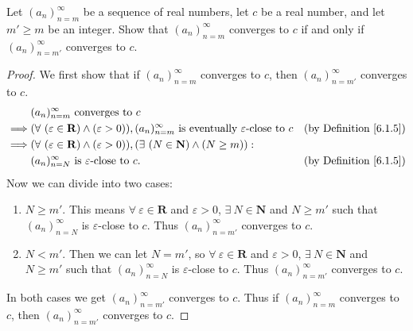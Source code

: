 \begin{exercise}\label{ex 6.1.3}
Let \((a_n)_{n = m}^\infty\) be a sequence of real numbers, let \(c\) be a real number, and let \(m' \geq m\) be an integer.
Show that \((a_n)_{n = m}^\infty\) converges to \(c\) if and only if \((a_n)_{n = m'}^\infty\) converges to \(c\).
\end{exercise}

\begin{proof}
We first show that if \((a_n)_{n = m}^\infty\) converges to \(c\), then \((a_n)_{n = m'}^\infty\) converges to \(c\).
\begin{align*}
& (a_n)_{n = m}^\infty \text{ converges to } c \\
\implies & (\forall\ (\varepsilon \in \mathbf{R}) \land (\varepsilon > 0)), (a_n)_{n = m}^\infty \text{ is eventually } \varepsilon\text{-close to } c & \text{(by Definition \ref{6.1.5})} \\
\implies & (\forall\ (\varepsilon \in \mathbf{R}) \land (\varepsilon > 0)), (\exists\ (N \in \mathbf{N}) \land (N \geq m)) : \\
& (a_n)_{n = N}^\infty \text{ is } \varepsilon\text{-close to } c. & \text{(by Definition \ref{6.1.5})}
\end{align*}
Now we can divide into two cases:
\begin{enumerate}
    \item \(N \geq m'\).
    This means \(\forall\ \varepsilon \in \mathbf{R}\) and \(\varepsilon > 0\), \(\exists\ N \in \mathbf{N}\) and \(N \geq m'\) such that \((a_n)_{n = N}^\infty\) is \(\varepsilon\)-close to \(c\).
    Thus \((a_n)_{n = m'}^\infty\) converges to \(c\).
    \item \(N < m'\).
    Then we can let \(N = m'\), so \(\forall\ \varepsilon \in \mathbf{R}\) and \(\varepsilon > 0\), \(\exists\ N \in \mathbf{N}\) and \(N \geq m'\) such that \((a_n)_{n = N}^\infty\) is \(\varepsilon\)-close to \(c\).
    Thus \((a_n)_{n = m'}^\infty\) converges to \(c\).
\end{enumerate}
In both cases we get \((a_n)_{n = m'}^\infty\) converges to \(c\).
Thus if \((a_n)_{n = m}^\infty\) converges to \(c\), then \((a_n)_{n = m'}^\infty\) converges to \(c\).


\end{proof}
